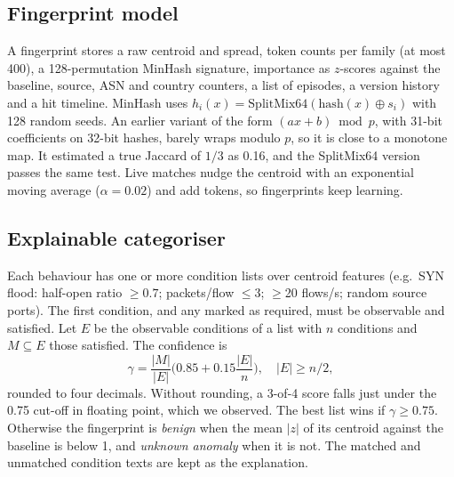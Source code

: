 \documentclass[conference]{IEEEtran}
\begin{document}
\subsection{Fingerprint model}
A fingerprint stores a raw centroid and spread, token counts per family (at most 400), a 128-permutation MinHash signature, importance as $z$-scores against the baseline, source, ASN and country counters, a list of episodes, a version history and a hit timeline. MinHash uses $h_i(x)=\mathrm{SplitMix64}(\mathrm{hash}(x)\oplus s_i)$ with 128 random seeds. An earlier variant of the form $(a x+b)\bmod p$, with 31-bit coefficients on 32-bit hashes, barely wraps modulo $p$, so it is close to a monotone map. It estimated a true Jaccard of $1/3$ as 0.16, and the SplitMix64 version passes the same test. Live matches nudge the centroid with an exponential moving average ($\alpha=0.02$) and add tokens, so fingerprints keep learning.

\subsection{Explainable categoriser}
Each behaviour has one or more condition lists over centroid features (e.g.\ SYN flood: half-open ratio $\ge0.7$; packets/flow $\le3$; $\ge$20 flows/s; random source ports). The first condition, and any marked as required, must be observable and satisfied. Let $E$ be the observable conditions of a list with $n$ conditions and $M\subseteq E$ those satisfied. The confidence is
\begin{equation}
\gamma=\frac{|M|}{|E|}\Big(0.85+0.15\frac{|E|}{n}\Big),\quad |E|\ge n/2,
\end{equation}
rounded to four decimals. Without rounding, a 3-of-4 score falls just under the 0.75 cut-off in floating point, which we observed. The best list wins if $\gamma\ge0.75$. Otherwise the fingerprint is \emph{benign} when the mean $|z|$ of its centroid against the baseline is below 1, and \emph{unknown anomaly} when it is not. The matched and unmatched condition texts are kept as the explanation.
\end{document}
